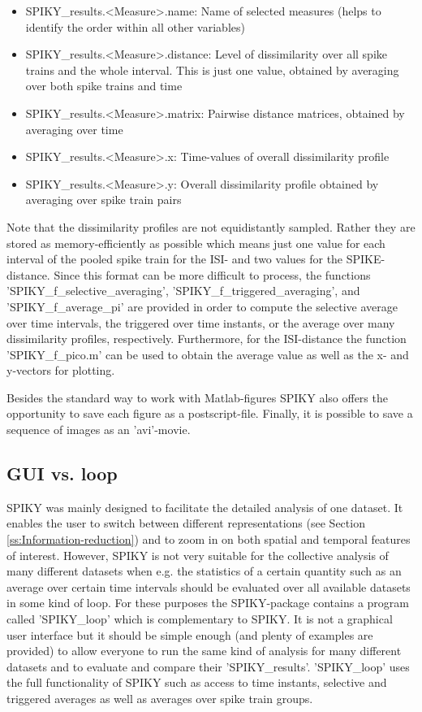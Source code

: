 \documentclass[10pt,twocolumn]{elsart5p}
\begin{document}
\begin{itemize}
\item SPIKY\_results.<Measure>.name: Name of selected measures (helps to identify the order within all other variables)
\item SPIKY\_results.<Measure>.distance: Level of dissimilarity over all spike trains and the whole interval. This is just one value, obtained by averaging over both spike trains and time
\item SPIKY\_results.<Measure>.matrix: Pairwise distance matrices, obtained by averaging over time
\item SPIKY\_results.<Measure>.x: Time-values of overall dissimilarity profile
\item SPIKY\_results.<Measure>.y: Overall dissimilarity profile obtained by averaging over spike train pairs
\end{itemize}

Note that the dissimilarity profiles are not equidistantly sampled. Rather they are stored as memory-efficiently as possible which means just one value for each interval of the pooled spike train for the ISI- and two values for the SPIKE-distance. Since this format can be more difficult to process, the functions 'SPIKY\_f\_selective\_averaging', 'SPIKY\_f\_triggered\_averaging', and 'SPIKY\_f\_average\_pi' are provided in order to compute the selective average over time intervals, the triggered over time instants, or the average over many dissimilarity profiles, respectively. Furthermore, for the ISI-distance the function 'SPIKY\_f\_pico.m' can be used to obtain the average value as well as the x- and y-vectors for plotting.

Besides the standard way to work with Matlab-figures SPIKY also offers the opportunity to save each figure as a postscript-file. Finally, it is possible to save a sequence of images as an 'avi'-movie.


\subsection{\label{ss:GUI-vs-loop} GUI vs. loop}

SPIKY was mainly designed to facilitate the detailed analysis of one dataset. It enables the user to switch between different representations (see Section \ref{ss:Information-reduction}) and to zoom in on both spatial and temporal features of interest. However, SPIKY is not very suitable for the collective analysis of many different datasets when e.g. the statistics of a certain quantity such as an average over certain time intervals should be evaluated over all available datasets in some kind of loop. For these purposes the SPIKY-package contains a program called 'SPIKY\_loop' which is complementary to SPIKY. It is not a graphical user interface but it should be simple enough (and plenty of examples are provided) to allow everyone to run the same kind of analysis for many different datasets and to evaluate and compare their 'SPIKY\_results'. 'SPIKY\_loop' uses the full functionality of SPIKY such as access to time instants, selective and triggered averages as well as averages over spike train groups.
\end{document}
